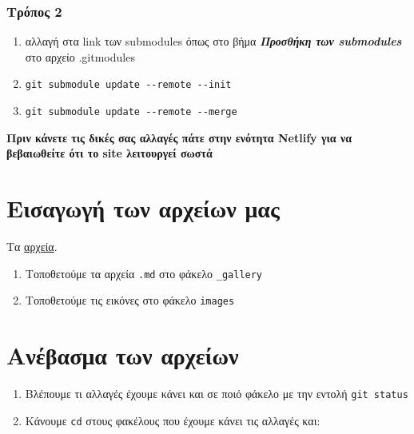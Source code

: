 \documentclass[
]{article}
\begin{document}
\hypertarget{ux3c4ux3c1ux3ccux3c0ux3bfux3c2-2}{%
\subsubsection{Τρόπος 2}\label{ux3c4ux3c1ux3ccux3c0ux3bfux3c2-2}}

\begin{enumerate}
\item
  αλλαγή στα link των submodules όπως στο βήμα \textbf{\emph{Προσθήκη
  των submodules}} στο αρχείο .gitmodules
\item
  \texttt{git~submodule~update~-\/-remote~-\/-init}
\item
  \texttt{git~submodule~update~-\/-remote~-\/-merge}
\end{enumerate}

\textbf{Πριν κάνετε τις δικές σας αλλαγές πάτε στην ενότητα Netlify για
να βεβαιωθείτε ότι το site λειτουργεί σωστά}

\hypertarget{ux3b5ux3b9ux3c3ux3b1ux3b3ux3c9ux3b3ux3ae-ux3c4ux3c9ux3bd-ux3b1ux3c1ux3c7ux3b5ux3afux3c9ux3bd-ux3bcux3b1ux3c2}{%
\section{Εισαγωγή των αρχείων
μας}\label{ux3b5ux3b9ux3c3ux3b1ux3b3ux3c9ux3b3ux3ae-ux3c4ux3c9ux3bd-ux3b1ux3c1ux3c7ux3b5ux3afux3c9ux3bd-ux3bcux3b1ux3c2}}

Τα \href{https://courses-ionio.github.io/help/social/}{αρχεία}.

\begin{enumerate}
\item
  Τοποθετούμε τα αρχεία \texttt{.md} στο φάκελο \texttt{\_gallery}
\item
  Τοποθετούμε τις εικόνες στο φάκελο \texttt{images}
\end{enumerate}

\hypertarget{ux3b1ux3bdux3adux3b2ux3b1ux3c3ux3bcux3b1-ux3c4ux3c9ux3bd-ux3b1ux3c1ux3c7ux3b5ux3afux3c9ux3bd}{%
\section{Ανέβασμα των
αρχείων}\label{ux3b1ux3bdux3adux3b2ux3b1ux3c3ux3bcux3b1-ux3c4ux3c9ux3bd-ux3b1ux3c1ux3c7ux3b5ux3afux3c9ux3bd}}

\begin{enumerate}
\item
  Βλέπουμε τι αλλαγές έχουμε κάνει και σε ποιό φάκελο με την εντολή
  \texttt{git~status}
\item
  Κάνουμε \texttt{cd} στους φακέλους που έχουμε κάνει τις αλλαγές και:
\end{enumerate}
\end{document}
